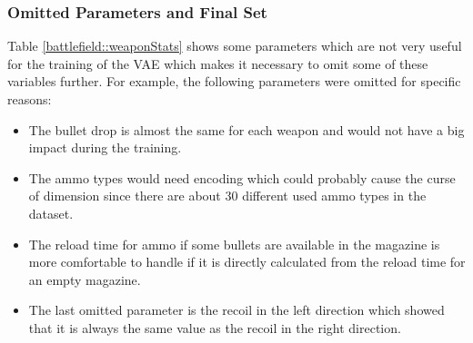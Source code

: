 \documentclass[MGS,Master,english]{twbook}%
\begin{document}
\subsubsection{Omitted Parameters and Final Set}
Table \ref{battlefield::weaponStats} shows some parameters which are not very useful for the training of the \ac{VAE} which makes it necessary to omit some of these variables further. For example, the following parameters were omitted for specific reasons:
\begin{itemize}
	\item The bullet drop is almost the same for each weapon and would not have a big impact during the training.
	\item The ammo types would need encoding which could probably cause the curse of dimension since there are about 30 different used ammo types in the dataset.
	\item The reload time for ammo if some bullets are available in the magazine is more comfortable to handle if it is directly calculated from the reload time for an empty magazine.
	\item The last omitted parameter is the recoil in the left direction which showed that it is always the same value as the recoil in the right direction.
\end{itemize}
\end{document}
